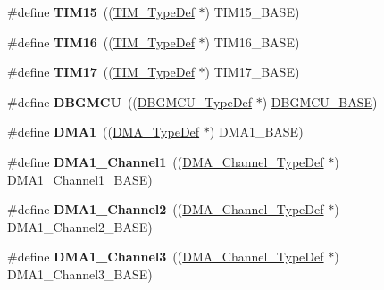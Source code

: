 \begin{DoxyCompactItemize}
\#define {\bfseries T\+I\+M15}~((\hyperlink{struct_t_i_m___type_def}{T\+I\+M\+\_\+\+Type\+Def} $\ast$) T\+I\+M15\+\_\+\+B\+A\+SE)
\item 
\mbox{\label{group___peripheral__declaration_ga73ec606e7dacf17e18c661e8ff8c7c8d}} 
\#define {\bfseries T\+I\+M16}~((\hyperlink{struct_t_i_m___type_def}{T\+I\+M\+\_\+\+Type\+Def} $\ast$) T\+I\+M16\+\_\+\+B\+A\+SE)
\item 
\mbox{\label{group___peripheral__declaration_ga65aea6c8b36439e44ad6cde0e6891aab}} 
\#define {\bfseries T\+I\+M17}~((\hyperlink{struct_t_i_m___type_def}{T\+I\+M\+\_\+\+Type\+Def} $\ast$) T\+I\+M17\+\_\+\+B\+A\+SE)
\item 
\mbox{\label{group___peripheral__declaration_ga92ec6d9ec2251fda7d4ce09748cd74b4}} 
\#define {\bfseries D\+B\+G\+M\+CU}~((\hyperlink{struct_d_b_g_m_c_u___type_def}{D\+B\+G\+M\+C\+U\+\_\+\+Type\+Def} $\ast$) \hyperlink{group___peripheral__memory__map_ga4adaf4fd82ccc3a538f1f27a70cdbbef}{D\+B\+G\+M\+C\+U\+\_\+\+B\+A\+SE})
\item 
\mbox{\label{group___peripheral__declaration_gacc16d2a5937f7585320a98f7f6b578f9}} 
\#define {\bfseries D\+M\+A1}~((\hyperlink{struct_d_m_a___type_def}{D\+M\+A\+\_\+\+Type\+Def} $\ast$) D\+M\+A1\+\_\+\+B\+A\+SE)
\item 
\mbox{\label{group___peripheral__declaration_gac83c5be824be1c02716e2522e80ddf7a}} 
\#define {\bfseries D\+M\+A1\+\_\+\+Channel1}~((\hyperlink{struct_d_m_a___channel___type_def}{D\+M\+A\+\_\+\+Channel\+\_\+\+Type\+Def} $\ast$) D\+M\+A1\+\_\+\+Channel1\+\_\+\+B\+A\+SE)
\item 
\mbox{\label{group___peripheral__declaration_ga23d7631dd10c645e06971b2543ba2949}} 
\#define {\bfseries D\+M\+A1\+\_\+\+Channel2}~((\hyperlink{struct_d_m_a___channel___type_def}{D\+M\+A\+\_\+\+Channel\+\_\+\+Type\+Def} $\ast$) D\+M\+A1\+\_\+\+Channel2\+\_\+\+B\+A\+SE)
\item 
\mbox{\label{group___peripheral__declaration_gacf7b6093a37b306d7f1f50b2f200f0d0}} 
\#define {\bfseries D\+M\+A1\+\_\+\+Channel3}~((\hyperlink{struct_d_m_a___channel___type_def}{D\+M\+A\+\_\+\+Channel\+\_\+\+Type\+Def} $\ast$) D\+M\+A1\+\_\+\+Channel3\+\_\+\+B\+A\+SE)

\end{DoxyCompactItemize}
